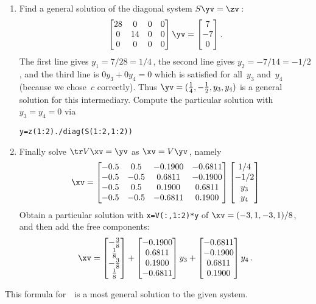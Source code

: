 \begin{example}
\begin{solution}
\begin{enumerate}
\item Find a general solution of the diagonal system \(S\yv=\zv\)\,:
\begin{equation*}
\begin{bmatrix}28&0&0&0
\\0&14&0&0
\\0&0&0&0 \end{bmatrix}\yv=\begin{bmatrix} 7\\-7\\0 \end{bmatrix}.
\end{equation*}
The first line gives \(y_1=7/28=1/4\)\,, the second line gives \(y_2=-7/14=-1/2\), and the third line is \(0y_3+0y_4=0\) which is satisfied for all~\(y_3\) and~\(y_4\) (because we chose~\(c\) correctly).
Thus \(\yv=(\frac14,-\frac12,y_3,y_4)\) is a general solution for this intermediary.
Compute the particular solution with \(y_3=y_4=0\) via 
\begin{verbatim}
y=z(1:2)./diag(S(1:2,1:2))
\end{verbatim}

\item Finally solve \(\tr V\xv=\yv\) as \(\xv=V\yv\)\,, namely
\begin{equation*}
\xv=\begin{bmatrix} -0.5&0.5&-0.1900&-0.6811
\\-0.5&-0.5&0.6811&-0.1900
\\-0.5&0.5&0.1900&0.6811
\\-0.5&-0.5&-0.6811&0.1900 \end{bmatrix}
\begin{bmatrix} 1/4\\-1/2\\y_3\\y_4 \end{bmatrix}
\end{equation*}
Obtain a particular solution with \verb|x=V(:,1:2)*y| of \(\xv=(-3,1,-3,1)/8\), and then add the free components:
\begin{equation*}
\xv=\begin{bmatrix} -\frac38\\\frac18\\-\frac38\\\frac18 \end{bmatrix}
+\begin{bmatrix}-0.1900
\\0.6811
\\0.1900
\\-0.6811 \end{bmatrix}y_3
+\begin{bmatrix} -0.6811
\\-0.1900
\\0.6811
\\0.1900 \end{bmatrix}y_4\,.
\end{equation*}
\end{enumerate}
This formula for~\xv\ is a most general solution to the given system. 
\end{solution}
\end{example}

